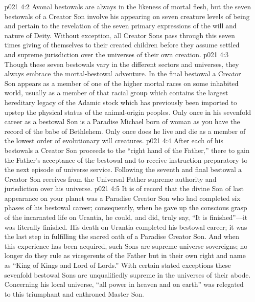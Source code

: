 \vs p021 4:2 Avonal bestowals are always in the likeness of mortal flesh, but the seven bestowals of a Creator Son involve his appearing on seven creature levels of being and pertain to the revelation of the seven primary expressions of the will and nature of Deity. Without exception, all Creator Sons pass through this seven times giving of themselves to their created children before they assume settled and supreme jurisdiction over the universes of their own creation.
\vs p021 4:3 Though these seven bestowals vary in the different sectors and universes, they always embrace the mortal\hyp{}bestowal adventure. In the final bestowal a Creator Son appears as a member of one of the higher mortal races on some inhabited world, usually as a member of that racial group which contains the largest hereditary legacy of the Adamic stock which has previously been imported to upstep the physical status of the animal\hyp{}origin peoples. Only once in his sevenfold career as a bestowal Son is a Paradise Michael born of woman as you have the record of the babe of Bethlehem. Only once does he live and die as a member of the lowest order of evolutionary will creatures.
\vs p021 4:4 After each of his bestowals a Creator Son proceeds to the “right hand of the Father,” there to gain the Father’s acceptance of the bestowal and to receive instruction preparatory to the next episode of universe service. Following the seventh and final bestowal a Creator Son receives from the Universal Father supreme authority and jurisdiction over his universe.
\pc \vs p021 4:5 It is of record that the divine Son of last appearance on your planet was a Paradise Creator Son who had completed six phases of his bestowal career; consequently, when he gave up the conscious grasp of the incarnated life on Urantia, he could, and did, truly say, \textcolor{ubdarkred}{“It is finished”}---it was literally finished. His death on Urantia completed his bestowal career; it was the last step in fulfilling the sacred oath of a Paradise Creator Son. And when this experience has been acquired, such Sons are supreme universe sovereigns; no longer do they rule as vicegerents of the Father but in their own right and name as “King of Kings and Lord of Lords.” With certain stated exceptions these sevenfold bestowal Sons are unqualifiedly supreme in the universes of their abode. Concerning his local universe, “all power in heaven and on earth” was relegated to this triumphant and enthroned Master Son.
